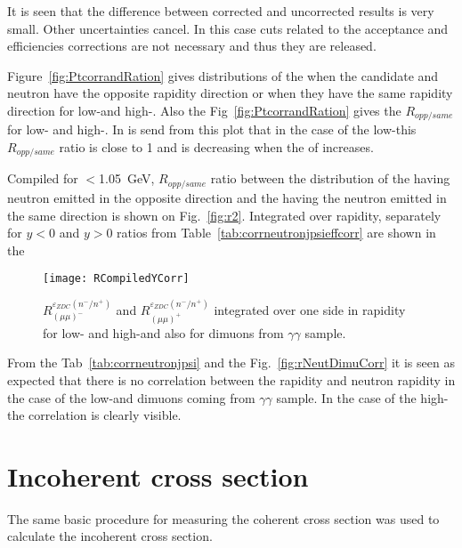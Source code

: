     It is seen that the difference between corrected and uncorrected results is
      very small. 
    Other uncertainties cancel. 
    In this case cuts related to the acceptance and efficiencies corrections 
      are not necessary and thus they are released.

    Figure~\ref{fig:PtcorrandRation} gives \pt distributions of the \JPsi 
      when the \JPsi{} candidate and neutron have the opposite rapidity 
      direction or when they have the same rapidity direction for low-\pt and 
      high-\pt \JPsi{}. 
    Also the Fig~\ref{fig:PtcorrandRation} gives the $R_{opp/same}$ for low-\pt
      and high-\pt \JPsi. 
    In is send from this plot that in the case of the low-\pt \JPsi this 
      $R_{opp/same}$ ratio is close to 1 and is decreasing when the \pt of
      \JPsi{} increases.

    Compiled for \pt$<$1.05~GeV, $R_{opp/same}$ ratio between the \pt 
      distribution of the \JPsi having neutron emitted in the opposite 
      direction and  the \JPsi having the neutron emitted in the same
      direction is shown on Fig.~\ref{fig:r2}. 
    Integrated over rapidity, separately for $y<0$ and $y>0$ ratios from 
      Table~\ref{tab:corrneutronjpsieffcorr} are shown in the 

    \begin{figure*}[!Hhtb]
      \begin{center}
        \texttt{[image: RCompiledYCorr]}
        \caption{ \label{fig:integRatios} 
          $R_{(\mu\mu)^{-}}^{\varepsilon_{ZDC}(n^{-}/n^{+})}$ and 
          $R_{(\mu\mu)^{+}}^{\varepsilon_{ZDC}(n^{-}/n^{+})}$ integrated over 
          one side in rapidity for low- and high-\pt \JPsi and also for dimuons
          from $\gamma \gamma$ sample. }
      \end{center}
    \end{figure*}
    \DIFdelbegin %

\DIFdelend From the Tab~\ref{tab:corrneutronjpsi} and the Fig.~\ref{fig:rNeutDimuCorr} 
      it is seen as expected that there is no correlation between the \JPsi 
      rapidity and neutron rapidity in the case of the low-\pt \JPsi and 
      dimuons coming from $\gamma \gamma$ sample. 
    In the case of the high-\pt \JPsi the correlation is clearly visible. 

  \section{Incoherent cross section}
  The same basic procedure for measuring the coherent cross section was used to 
    calculate the incoherent cross section.  
